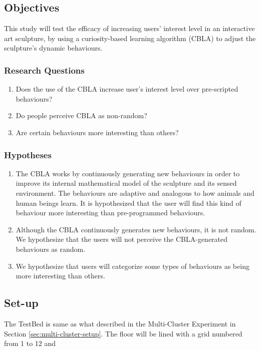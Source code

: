 \subsection{Objectives}
This study will test the efficacy of increasing users' interest level in an interactive art sculpture, by using a curiosity-based learning algorithm (CBLA) to adjust the sculpture's dynamic behaviours. 

\subsubsection{Research Questions}
\begin{enumerate}
	\item Does the use of the CBLA increase user's interest level over pre-scripted behaviours?
	\item Do people perceive CBLA as non-random?
	\item Are certain behaviours  more interesting than others?
\end{enumerate}


\subsubsection{Hypotheses}
\begin{enumerate}
	\item The CBLA works by continuously generating new behaviours in order to improve its internal mathematical model of the sculpture and its sensed environment. The behaviours are adaptive and analogous to how animals and human beings learn. It is hypothesized that the user will find this kind of behaviour more interesting than pre-programmed behaviours.
	\item Although the CBLA continuously generates new behaviours, it is not random. We hypothesize that the users will not perceive the CBLA-generated behaviours as random. 
	\item We hypothesize that users will categorize some types of behaviours as being more interesting than others. 
\end{enumerate}

\subsection{Set-up}

The TestBed is same as what described in the Multi-Cluster Experiment in Section \ref{sec:multi-cluster-setup}. The floor will be lined with a grid numbered from 1 to 12 and 

